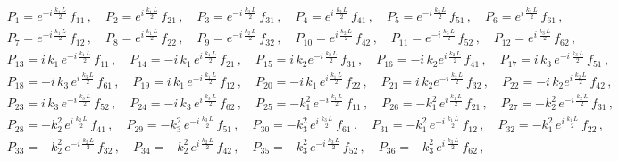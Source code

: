 \documentclass[aps,prb,onecolumn,longbibliography,nofootinbib,citeautoscript,10pt]{revtex4-2}
\def \nn{\nonumber \\}
\def\nn{\nonumber \\}
\def \nn{\nonumber \\}
\begin{document}
\begin{align}
& P_1   = e^{- i \, \frac{ k_1 \, L} {2}} \, f_{11} \,,  \quad 
P_2 = e^{ i \, \frac{ k_1 \, L} {2}} \, f_{21} \,,  
\quad P_3 = e^{- i \, \frac{ k_2 \, L} {2}} \, f_{31} \,, \quad  
P_4 = e^{ i \, \frac{ k_2 \, L} {2}} \, f_{41} \,, 
\quad P_5  = e^{- i \, \frac{ k_3 \, L} {2}} \, f_{51} \,,  \quad 
P_6  = e^{ i \, \frac{ k_3 \, L} {2}} \, f_{61} \,, \nn &
P_7  = e^{- i \, \frac{ k_1 \, L} {2}} \, f_{12} \,,  \quad 
P_8  = e^{ i \, \frac{ k_1 \, L} {2}} \, f_{22} \,,  
\quad  P_9  = e^{- i \, \frac{ k_2 \, L} {2}} \, f_{32} \,,  
\quad P_{10}  = e^{ i \, \frac{ k_2 \, L} {2}} \, f_{42} \,,  \quad
 P_{11}  = e^{- i \, \frac{ k_3 \, L} {2}} \, f_{52} \,,  \quad
  P_{12} = e^{ i \, \frac{ k_3 \, L} {2}} \, f_{62} \,, \nn
& P_{13}  =  i \, k_1 \, e^{- i \, \frac{ k_1 \, L} {2}} \, f_{11} \,,  \quad
 P_{14}  = - i \, k_1 \, e^{ i \, \frac{ k_1 \, L} {2}} \, f_{21} \,,   \quad
 P_{15}  =  i \, k_2e^{- i \, \frac{ k_2 \, L} {2}} \, f_{31} \,,  \quad 
 P_{16}  = - i \, k_2e^{ i \, \frac{ k_2 \, L} {2}} \, f_{41} \,,  \quad  P_{17} 
 =  i \, k_3 \, e^{- i \, \frac{ k_3 \, L} {2}} \, f_{51} \,,  \nn &
 P_{18}  = - i \, k_3 \, e^{ i \, \frac{ k_3 \, L} {2}} \, f_{61} \,, \quad
P_{19}  =  i \, k_1 \, e^{- i \, \frac{ k_1 \, L} {2}} \, f_{12} \,,  \quad
 P_{20}  = - i \, k_1 \, e^{ i \, \frac{ k_1 \, L} {2}} \, f_{22} \,,  \quad
  P_{21}  =  i \, k_2e^{- i \, \frac{ k_2 \, L} {2}} \, f_{32} \,,  \quad 
  P_{22} = - i \, k_2e^{ i \, \frac{ k_2 \, L} {2}} \, f_{42} \,,  \nn &
  P_{23}  =  i \, k_3 \, e^{- i \, \frac{ k_3 \, L} {2}} \, f_{52} \,,\quad
  P_{24}  = - i \, k_3 \, e^{ i \, \frac{ k_3 \, L} {2}} \, f_{62} \,, \quad
P_{25}  = -k_1^2\, e^{- i \, \frac{ k_1 \, L} {2}} \, f_{11} \,,  \quad
 P_{26}  = -k_1^2\, e^{ i \, \frac{ k_1 \, L} {2}} \, f_{21} \,,  
\quad P_{27}  = -k_2^2\, e^{- i \, \frac{ k_2 \, L} {2}} \, f_{31} \,,  \nn &
 P_{28}  = -k_2^2\, e^{ i \, \frac{ k_2 \, L} {2}} \, f_{41} \,,  \quad
  P_{29}  = -k_3^2\, e^{- i \, \frac{ k_3 \, L} {2}} \, f_{51} \,,  
  \quad P_{30}  = -k_3^2\, e^{ i \, \frac{ k_3 \, L} {2}} \, f_{61} \,, \quad
P_{31} = -k_1^2\, e^{- i \, \frac{ k_1 \, L} {2}} \, f_{12} \,,  \quad
P_{32} = -k_1^2\, e^{ i \, \frac{ k_1 \, L} {2}} \, f_{22} \,, \nn & 
P_{33}  = -k_2^2\, e^{- i \, \frac{ k_2 \, L} {2}} \, f_{32} \,,  \quad 
P_{34}  = -k_2^2\, e^{ i \, \frac{ k_2 \, L} {2}} \, f_{42} \,,  \quad 
P_{35}  = -k_3^2\, e^{- i \, \frac{ k_3 \, L} {2}} \, f_{52} \,,  \quad
 P_{36}  = -k_3^2\, e^{ i \, \frac{ k_3 \, L} {2}} \, f_{62}\,,
\end{align}
\end{document}
